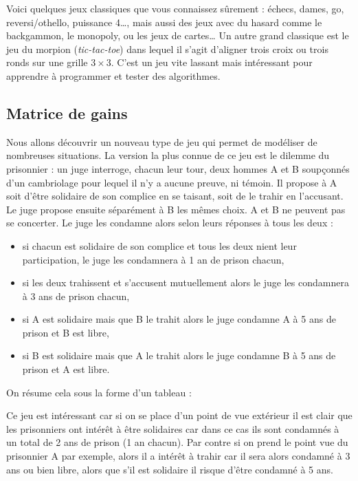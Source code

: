 \documentclass[11pt,class=report,crop=false]{standalone}
\begin{document}
Voici quelques jeux classiques que vous connaissez sûrement : échecs, dames, go, reversi/othello, puissance 4\ldots, mais aussi des jeux avec du hasard comme le backgammon, le monopoly, ou les jeux de cartes\ldots{} 
Un autre grand classique est le jeu du morpion (\emph{tic-tac-toe}) dans lequel il s'agit d'aligner trois croix ou trois ronds sur une grille $3 \times 3$. C'est un jeu vite lassant mais intéressant pour apprendre à programmer et tester des algorithmes.

\begin{center}
\end{center}


\subsection{Matrice de gains}


Nous allons découvrir un nouveau type de jeu qui permet de modéliser de nombreuses situations.
La version la plus connue de ce jeu est le \og{}dilemme du prisonnier\fg{} : un juge interroge, chacun leur tour, deux hommes A et B soupçonnés d'un cambriolage pour lequel il n'y a aucune preuve, ni témoin.
Il propose à A soit d'être solidaire de son complice en se taisant, soit de le trahir en l'accusant. Le juge propose ensuite séparément à B les mêmes choix. A et B ne peuvent pas se concerter.
Le juge les condamne alors selon leurs réponses à tous les deux :
\begin{itemize}
	\item si chacun est solidaire de son complice et tous les deux nient leur participation, le juge les condamnera à 1 an de prison chacun,
	\item si les deux trahissent et s'accusent mutuellement alors le juge les condamnera à 3 ans de prison chacun,
	\item si A est solidaire mais que B le trahit alors le juge condamne A à 5 ans de prison et B est libre,
	\item si B est solidaire mais que A le trahit alors le juge condamne B à 5 ans de prison et A est libre.
\end{itemize}
On résume cela sous la forme d'un tableau :



Ce jeu est intéressant car si on se place d'un point de vue extérieur il est clair que les prisonniers ont intérêt à être solidaires car dans ce cas ils sont condamnés à un total de 2 ans de prison (1 an chacun). Par contre si on prend le point vue du prisonnier A par exemple, alors il a intérêt à trahir car il sera alors condamné à 3 ans ou bien libre, alors que s'il est solidaire il risque d'être condamné à 5 ans.
\end{document}

